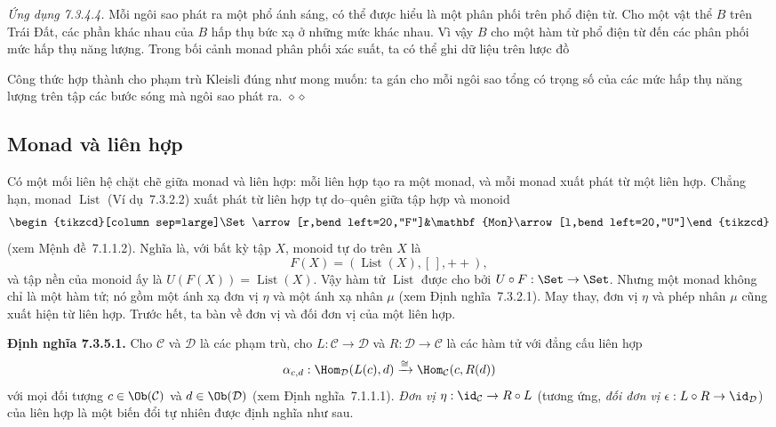 \noindent\textit{Ứng dụng 7.3.4.4.}\keepwithnext
Mỗi ngôi sao phát ra một phổ ánh sáng, có thể được hiểu là một phân phối trên phổ điện từ. Cho một vật thể $B$ trên Trái Đất, các phần khác nhau của $B$ hấp thụ bức xạ ở những mức khác nhau. Vì vậy $B$ cho một hàm từ phổ điện từ đến các phân phối mức hấp thụ năng lượng. Trong bối cảnh monad phân phối xác suất, ta có thể ghi dữ liệu trên lược đồ
\begin{center}
\end{center}
Công thức hợp thành cho phạm trù Kleisli đúng như mong muốn: ta gán cho mỗi ngôi sao tổng có trọng số của các mức hấp thụ năng lượng trên tập các bước sóng mà ngôi sao phát ra.
\hfill$\diamond\diamond$

\subsection{Monad và liên hợp}
Có một mối liên hệ chặt chẽ giữa monad và liên hợp: mỗi liên hợp tạo ra một monad, và mỗi monad xuất phát từ một liên hợp. Chẳng hạn, monad $\operatorname{List}$ (Ví dụ~7.3.2.2) xuất phát từ liên hợp tự do--quên giữa tập hợp và monoid
\[
\begin{tikzcd}[column sep=large]\Set\arrow[r,bend left=20,"F"]&\mathbf{Mon}\arrow[l,bend left=20,"U"]\end{tikzcd}
\]
(xem Mệnh đề~7.1.1.2). Nghĩa là, với bất kỳ tập $X$, monoid tự do trên $X$ là
\[
F(X)=(\operatorname{List}(X),[\,],{+}{+}),
\]
và tập nền của monoid ấy là $U(F(X))=\operatorname{List}(X)$. Vậy hàm tử $\operatorname{List}$ được cho bởi $U\circ F:\Set\to\Set$. Nhưng một monad không chỉ là một hàm tử; nó gồm một ánh xạ đơn vị $\eta$ và một ánh xạ nhân $\mu$ (xem Định nghĩa~7.3.2.1). May thay, đơn vị $\eta$ và phép nhân $\mu$ cũng xuất hiện từ liên hợp. Trước hết, ta bàn về đơn vị và đối đơn vị của một liên hợp.

\noindent\textbf{Định nghĩa 7.3.5.1.}\keepwithnext
Cho $\mathcal C$ và $\mathcal D$ là các phạm trù, cho $L:\mathcal C\to\mathcal D$ và $R:\mathcal D\to\mathcal C$ là các hàm tử với đẳng cấu liên hợp
\[
\alpha_{c,d}:\Hom_{\mathcal D}(L(c),d)\xrightarrow{\cong}\Hom_{\mathcal C}(c,R(d))
\]
với mọi đối tượng $c\in\Ob(\mathcal C)$ và $d\in\Ob(\mathcal D)$ (xem Định nghĩa~7.1.1.1). \emph{Đơn vị $\eta:\id_{\mathcal C}\to R\circ L$} (tương ứng, \emph{đối đơn vị $\epsilon:L\circ R\to\id_{\mathcal D}$}) của liên hợp là một biến đổi tự nhiên được định nghĩa như sau.

